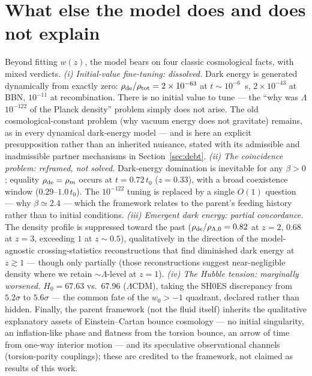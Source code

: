 \documentclass[11pt]{article}
\begin{document}
\section{What else the model does and does not explain}
Beyond fitting $w(z)$, the model bears on four classic cosmological facts, with mixed verdicts. \emph{(i) Initial-value fine-tuning: dissolved.} Dark energy is generated dynamically from exactly zero: $\rho_{\rm de}/\rho_{\rm tot} = 2\times10^{-63}$ at $t \sim 10^{-6}$~s, $2\times10^{-43}$ at BBN, $10^{-11}$ at recombination. There is no initial value to tune --- the ``why was $\Lambda$ $10^{-122}$ of the Planck density'' problem simply does not arise. The old cosmological-constant problem (why vacuum energy does not gravitate) remains, as in every dynamical dark-energy model --- and is here an explicit presupposition rather than an inherited nuisance, stated with its admissible and inadmissible partner mechanisms in Section~\ref{sec:debt}. \emph{(ii) The coincidence problem: reframed, not solved.} Dark-energy domination is inevitable for any $\beta > 0$; equality $\rho_{\rm de} = \rho_m$ occurs at $t = 0.72\,t_0$ ($z = 0.33$), with a broad coexistence window ($0.29$--$1.0\,t_0$). The $10^{-122}$ tuning is replaced by a single $O(1)$ question --- why $\beta \simeq 2.4$ --- which the framework relates to the parent's feeding history rather than to initial conditions. \emph{(iii) Emergent dark energy: partial concordance.} The density profile is suppressed toward the past ($\rho_{\rm de}/\rho_{\Lambda,0} = 0.82$ at $z=2$, $0.68$ at $z=3$, exceeding $1$ at $z \sim 0.5$), qualitatively in the direction of the model-agnostic crossing-statistics reconstructions that find diminished dark energy at $z \gtrsim 1$ --- though only partially (those reconstructions suggest near-negligible density where we retain $\sim\Lambda$-level at $z=1$). \emph{(iv) The Hubble tension: marginally worsened.} $H_0 = 67.63$ vs.\ $67.96$ ($\Lambda$CDM), taking the SH0ES discrepancy from $5.2\sigma$ to $5.6\sigma$ --- the common fate of the $w_0 > -1$ quadrant, declared rather than hidden. Finally, the parent framework (not the fluid itself) inherits the qualitative explanatory assets of Einstein--Cartan bounce cosmology --- no initial singularity, an inflation-like phase and flatness from the torsion bounce, an arrow of time from one-way interior motion --- and its speculative observational channels (torsion-parity couplings); these are credited to the framework, not claimed as results of this work.
\end{document}
